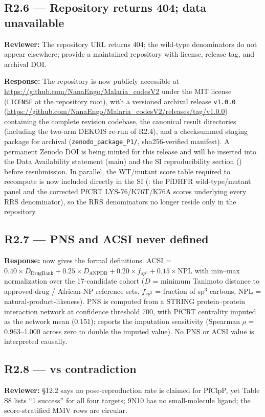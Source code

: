 \documentclass[11pt]{article}
\begin{document}
\subsection*{R2.6 --- Repository returns 404; data unavailable}
\textbf{Reviewer:} The repository URL returns 404; the wild-type denominators do not appear
elsewhere; provide a maintained repository with license, release tag, and archival DOI.

\textbf{Response:} The repository is now publicly accessible at
\url{https://github.com/NanaEngo/Malaria_codesV2} under the MIT license (\texttt{LICENSE} at
the repository root), with a versioned archival release \texttt{v1.0.0}
(\url{https://github.com/NanaEngo/Malaria_codesV2/releases/tag/v1.0.0}) containing the complete
revision codebase, the canonical result directories (including the two-arm DEKOIS re-run of
R2.4), and a checksummed staging package for archival (\texttt{zenodo\_package\_P1/},
sha256-verified manifest). A permanent Zenodo DOI is being minted for this release and will be
inserted into the Data Availability statement (main) and the SI reproducibility section
() before resubmission. In parallel, the WT/mutant score table required to
recompute  is now included directly in the SI (: the
PfDHFR wild-type/mutant panel and the corrected PfCRT LYS-76/K76T/K76A scores underlying
every RRS denominator), so the RRS denominators no longer reside only in the repository.

\subsection*{R2.7 --- PNS and ACSI never defined}
\textbf{Response:}  now gives the formal definitions. ACSI =
$0.40\times D_{\mathrm{DrugBank}} + 0.25\times D_{\mathrm{ANPDB}} + 0.20\times f_{sp^3}
+ 0.15\times \mathrm{NPL}$ with min--max normalization over the 17-candidate cohort
($D$ = minimum Tanimoto distance to approved-drug / African-NP reference sets, $f_{sp^3}$ =
fraction of sp$^3$ carbons, NPL = natural-product-likeness). PNS is computed from a STRING
protein--protein interaction network at confidence threshold 700, with PfCRT centrality imputed
as the network mean (0.151);  reports the imputation sensitivity (Spearman
$\rho$ = 0.963--1.000 across zero to double the imputed value). No PNS or ACSI value is
interpreted causally.

\subsection*{R2.8 ---  vs  contradiction}
\textbf{Reviewer:} \S12.2 says no pose-reproduction rate is claimed for PfClpP, yet Table S8
lists ``1 success'' for all four targets; 9N10 has no small-molecule ligand; the score-stratified
MMV rows are circular.
\end{document}
